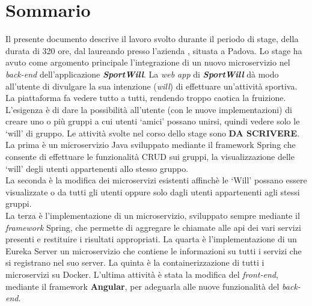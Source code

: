 
\cleardoublepage
{}
{}
\begingroup
\let\clearpage\relax
\let\cleardoublepage\relax
\let\cleardoublepage\relax

\chapter*{Sommario}

Il presente documento descrive il lavoro svolto durante il periodo di stage, della durata di 320 ore, dal laureando \myName presso l'azienda \myCompany, situata a Padova.
Lo stage ha avuto come argomento principale l'integrazione di un nuovo microservizio nel \textit{back-end} dell'applicazione \textbf{\textit{SportWill}}.
La \textit{web app} di \textbf{\textit{SportWill}} dà modo all'utente di divulgare la sua intenzione (\textit{will}) di effettuare un'attività sportiva. La piattaforma fa vedere tutto a tutti, rendendo troppo caotica la fruizione. 
L'esigenza è di dare la possibilità all'utente (con le nuove implementazioni) di creare uno o più gruppi a cui utenti \enquote*{amici} possano unirsi, quindi vedere solo le \enquote*{will} di gruppo.
Le attività svolte nel corso dello stage sono \textbf{DA SCRIVERE}.
La prima è un \gls{microservizio} Java sviluppato mediante il \gls{framework} \gls{Spring} che consente di effettuare le funzionalità \gls{CRUD} sui gruppi, 
la visualizzazione delle \enquote*{will} degli utenti appartenenti allo stesso gruppo.\\
La seconda è la modifica dei microservizi esistenti affinchè le \enquote*{Will} possano essere visualizzate o da tutti gli utenti oppure solo dagli utenti appartenenti agli stessi gruppi.\\
La terza è l'implementazione di un microservizio, sviluppato sempre mediante il \textit{framework} Spring, che permette di aggregare le chiamate 
alle \gls{api} dei vari servizi presenti e restituire i risultati appropriati.
La quarta è l'implementazione di un \gls{Eureka Server} un microservizio che contiene le informazioni su tutti i servizi che si registrano nel suo server.
La quinta è la \gls{containerizzazione} di tutti i microservizi su \gls{Docker}.
L'ultima attività è stata la modifica del \textit{front-end}, mediante il framework \textbf{Angular}, per adeguarla alle nuove funzionalità del \textit{back-end}.
%
%

\endgroup			

\vfill


